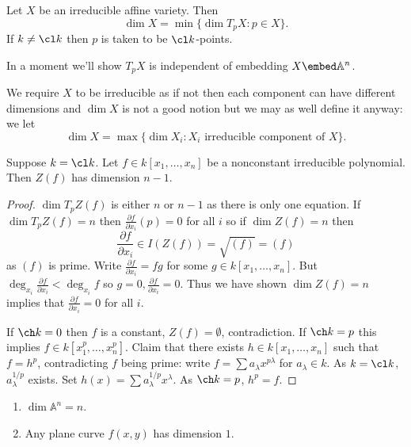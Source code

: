 \documentclass[a4paper]{article}
\renewcommand{\A}{\mathbb{A}}
\begin{document}
\begin{definition}[dimension]
  Let \(X\) be an irreducible affine variety. Then
  \[
    \dim X = \min \{\dim T_pX: p \in X\}.
  \]
  If \(k \neq \cl k\) then \(p\) is taken to be \(\cl k\)-points.
\end{definition}

In a moment we'll show \(T_pX\) is independent of embedding \(X \embed \A^n\).

We require \(X\) to be irreducible as if not then each component can have different dimensions and \(\dim X\) is not a good notion but we may as well define it anyway: we let
\[
  \dim X = \max \{\dim X_i: X_i \text{ irreducible component of } X\}.
\]

\begin{lemma}
  Suppose \(k = \cl k\). Let \(f \in k[x_1, \dots, x_n]\) be a nonconstant irreducible polynomial. Then \(Z(f)\) has dimension \(n - 1\).
\end{lemma}

\begin{proof}
  \(\dim T_p Z(f)\) is either \(n\) or \(n - 1\) as there is only one equation. If \(\dim T_pZ(f) = n\) then \(\frac{\partial f}{\partial x_i}(p) = 0\) for all \(i\) so if \(\dim Z(f) = n\) then
  \[
    \frac{\partial f}{\partial x_i} \in I(Z(f)) = \sqrt{(f)} = (f)
  \]
  as \((f)\) is prime. Write \(\frac{\partial f}{\partial x_i} = fg\) for some \(g \in k[x_1, \dots, x_n]\). But \(\deg_{x_i} \frac{\partial f}{\partial x_i} < \deg_{x_i} f\) so \(g = 0, \frac{\partial f}{\partial x_i} = 0\). Thus we have shown \(\dim Z(f) = n\) implies that \(\frac{\partial f}{\partial x_i} = 0\) for all \(i\).

  If \(\ch k = 0\) then \(f\) is a constant, \(Z(f) = \emptyset\), contradiction. If \(\ch k = p\) this implies \(f \in k[x_1^p, \dots, x_n^p]\). Claim that there exists \(h \in k[x_1, \dots, x_n]\) such that \(f = h^p\), contradicting \(f\) being prime: write \(f = \sum a_\lambda x^{p \lambda}\) for \(a_\lambda \in k\). As \(k = \cl k\), \(a_\lambda^{1/p}\) exists. Set \(h(x) = \sum a_\lambda^{1/p} x^\lambda\). As \(\ch k = p\), \(h^p = f\).
\end{proof}

\begin{eg}\leavevmode
  \begin{enumerate}
  \item \(\dim \A^n = n\).
  \item Any plane curve \(f(x, y)\) has dimension \(1\).
  \end{enumerate}
\end{eg}
\end{document}
